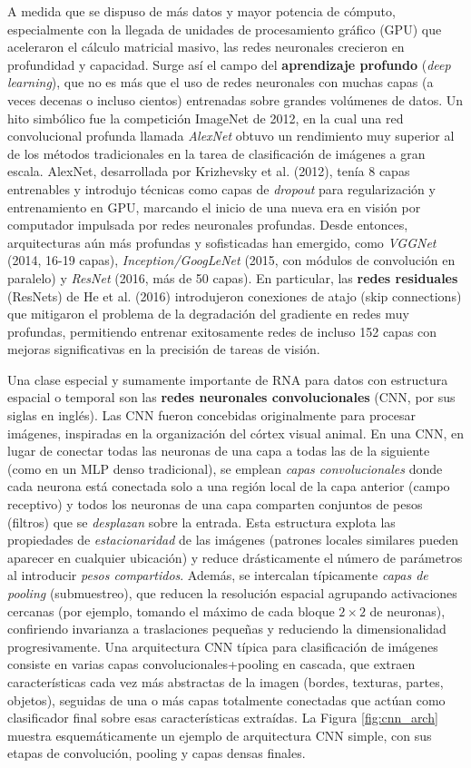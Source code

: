 \documentclass[11pt,spanish,listoffigures,listoftables]{tfgetsinf}
\begin{document}
A medida que se dispuso de más datos y mayor potencia de cómputo, especialmente con la llegada de unidades de procesamiento gráfico (GPU) que aceleraron el cálculo 
matricial masivo, las redes neuronales crecieron en profundidad y capacidad. Surge así el campo del \textbf{aprendizaje profundo} (\textit{deep learning}), que no es 
más que el uso de redes neuronales con muchas capas (a veces decenas o incluso cientos) entrenadas sobre grandes volúmenes de datos. Un hito simbólico fue la competición 
ImageNet de 2012, en la cual una red convolucional profunda llamada \textit{AlexNet} obtuvo un rendimiento muy superior al de los métodos tradicionales en la tarea de 
clasificación de imágenes a gran escala. AlexNet, desarrollada por Krizhevsky et al. (2012), tenía 8 capas entrenables y introdujo técnicas como capas de \textit{dropout} 
para regularización y entrenamiento en GPU, marcando el inicio de una nueva era en visión por computador impulsada por redes neuronales profundas. Desde entonces, 
arquitecturas aún más profundas y sofisticadas han emergido, como \textit{VGGNet} (2014, 16-19 capas), \textit{Inception/GoogLeNet} (2015, con módulos de convolución 
en paralelo) y \textit{ResNet} (2016, más de 50 capas). En particular, las \textbf{redes residuales} (ResNets) de He et al. (2016) introdujeron conexiones de atajo 
(skip connections) que mitigaron el problema de la degradación del gradiente en redes muy profundas, permitiendo entrenar exitosamente redes de incluso 152 capas con 
mejoras significativas en la precisión de tareas de visión.

Una clase especial y sumamente importante de RNA para datos con estructura espacial o temporal son las \textbf{redes neuronales convolucionales} 
(CNN, por sus siglas en inglés). Las CNN fueron concebidas originalmente para procesar imágenes, inspiradas en la organización del córtex visual animal. 
En una CNN, en lugar de conectar todas las neuronas de una capa a todas las de la siguiente (como en un MLP denso tradicional), se emplean \textit{capas convolucionales} 
donde cada neurona está conectada solo a una región local de la capa anterior (campo receptivo) y todos los neuronas de una capa comparten conjuntos de pesos (filtros)
que se \textit{desplazan} sobre la entrada. Esta estructura explota las propiedades de \textit{estacionaridad} de las imágenes (patrones locales similares pueden 
aparecer en cualquier ubicación) y reduce drásticamente el número de parámetros al introducir \textit{pesos compartidos}. Además, se intercalan típicamente 
\textit{capas de pooling} (submuestreo), que reducen la resolución espacial agrupando activaciones cercanas (por ejemplo, tomando el máximo de cada bloque $2\times2$ 
de neuronas), confiriendo invarianza a traslaciones pequeñas y reduciendo la dimensionalidad progresivamente. Una arquitectura CNN típica para clasificación de 
imágenes consiste en varias capas convolucionales+pooling en cascada, que extraen características cada vez más abstractas de la imagen (bordes, texturas, partes, objetos), 
seguidas de una o más capas totalmente conectadas que actúan como clasificador final sobre esas características extraídas. La Figura \ref{fig:cnn_arch} muestra 
esquemáticamente un ejemplo de arquitectura CNN simple, con sus etapas de convolución, pooling y capas densas finales.
\end{document}
